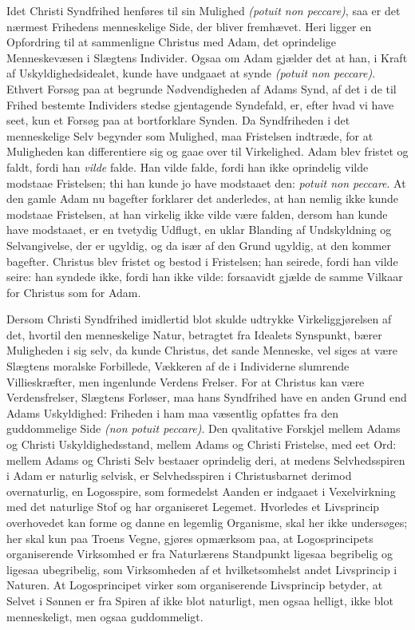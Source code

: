\documentclass[12pt]{book}
\begin{document}
Idet Christi Syndfrihed henføres til sin Mulighed \textit{(potuit
non peccare)}, saa er det nærmest Frihedens menneskelige Side, der
bliver fremhævet. Heri ligger en Opfordring til at sammenligne
Christus med Adam, det oprindelige Menneskevæsen i Slægtens
Individer. Ogsaa om Adam gjælder det at han, i Kraft af
Uskyldighedsidealet, kunde have undgaaet at synde \textit{(potuit
non peccare)}. Ethvert Forsøg paa at begrunde Nødvendigheden af
Adams Synd, af det i de til Frihed bestemte Individers stedse
gjentagende Syndefald, er, efter hvad vi have seet, kun et Forsøg
paa at bortforklare Synden.
Da Syndfriheden i det menneskelige Selv begynder som Mulighed, maa
Fristelsen indtræde, for at Muligheden kan differentiere sig og gaae
over til Virkelighed. Adam blev fristet og faldt, fordi han
\emph{vilde} falde. Han vilde falde, fordi han ikke oprindelig vilde
modstaae Fristelsen; thi
han kunde jo have modstaaet den: \textit{potuit non peccare}. At den
gamle Adam nu bagefter forklarer det anderledes, at han nemlig ikke
kunde modstaae Fristelsen, at han virkelig ikke vilde være falden,
dersom han kunde have modstaaet, er en tvetydig Udflugt, en uklar
Blanding af Undskyldning og Selvangivelse, der er ugyldig, og da især
af den Grund ugyldig, at den kommer bagefter. Christus blev fristet
og bestod i Fristelsen; han seirede, fordi han vilde seire: han
syndede ikke, fordi han ikke vilde: forsaavidt gjælde de samme
Vilkaar for Christus som for Adam.

Dersom Christi Syndfrihed imidlertid blot skulde udtrykke
Virkeliggjørelsen af det, hvortil den menneskelige Natur, betragtet
fra Idealets Synspunkt, bærer Muligheden i sig selv, da kunde
Christus, det sande Menneske, vel siges at være Slægtens moralske
Forbillede, Vækkeren af de i Individerne slumrende Villieskræfter,
men ingenlunde Verdens Frelser. For at Christus kan være
Verdensfrelser, Slægtens Forløser, maa hans Syndfrihed have en anden
Grund end Adams Uskyldighed: Friheden i ham maa væsentlig opfattes
fra den guddommelige Side \textit{(non potuit peccare)}. Den
qvalitative Forskjel mellem Adams og Christi Uskyldighedsstand,
mellem Adams og Christi Fristelse, med eet Ord: mellem Adams og
Christi Selv bestaaer oprindelig deri, at medens Selvhedsspiren i
Adam er naturlig selvisk, er Selvhedsspiren i Christusbarnet derimod
overnaturlig, en Logosspire, som formedelst Aanden er indgaaet i
Vexelvirkning med det naturlige Stof og har organiseret Legemet.
Hvorledes et Livsprincip overhovedet kan forme og danne en legemlig
Organisme, skal her ikke undersøges; her skal kun paa Troens Vegne,
gjøres opmærksom paa, at Logosprincipets organiserende Virksomhed er
fra Naturlærens Standpunkt ligesaa begribelig og ligesaa ubegribelig,
som Virksomheden af et hvilketsomhelst andet Livsprincip i Naturen.
At
Logosprincipet virker som organiserende Livsprincip betyder, at
Selvet i Sønnen er fra Spiren af ikke blot naturligt, men ogsaa
helligt, ikke blot menneskeligt, men ogsaa guddommeligt.
\end{document}
